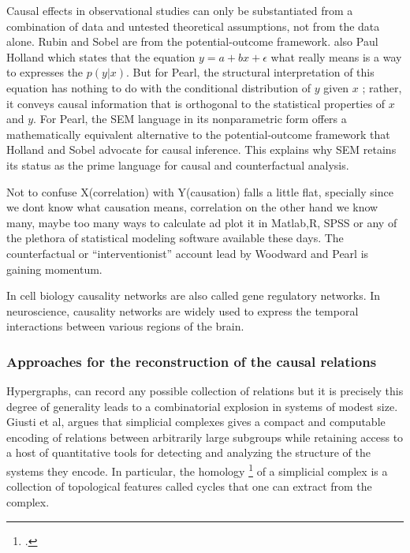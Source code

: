 \documentclass[onecollarge,runningheads]{svjour2}
\begin{document}
Causal effects in observational studies can only be substantiated from a combination of data and untested theoretical assumptions, not from the data alone.
Rubin and Sobel are from the potential-outcome framework. also Paul Holland which states that the equation $y = a +bx+ \epsilon$ what really means is a way to expresses the $p(y|x)$. But for Pearl, the  structural interpretation of this equation has nothing to do with the conditional distribution of ${y}$ given  ${x}$ ; rather, it conveys causal information that is orthogonal to the statistical properties of  ${x}$  and  ${y}$. For Pearl, the SEM language in its nonparametric form offers a mathematically equivalent alternative to the potential-outcome framework that Holland and Sobel advocate for causal inference. This explains why SEM retains its status as the prime language for causal and counterfactual analysis.

\citep{wiedermann2016statistics}
Not to confuse X(correlation) with Y(causation) falls a little flat, specially since we dont know what causation means, correlation on the other hand we know many, maybe too many ways to calculate ad plot it in Matlab,R, SPSS or any of the plethora of statistical modeling software available these days. 
The counterfactual or “interventionist” account lead by Woodward and Pearl is gaining momentum.

In cell biology causality networks are also called gene regulatory networks. In neuroscience, causality networks are widely used to express the temporal interactions between various regions of the brain.
\subsubsection{Approaches for the reconstruction of the causal relations}
Hypergraphs, can record any possible collection of relations but it is precisely this degree of generality leads to a combinatorial explosion in systems of modest size. 
Giusti et al, argues that simplicial complexes gives a compact and computable encoding of relations between arbitrarily large subgroups while retaining access to a host of quantitative tools for detecting and analyzing the structure of the systems they encode. In particular, the homology \footcite{Names of topological objects have a seemingly pathological tendency to conflict with terms in biology, so long have the two subjects been separated. Mathematical homology has no a priori relationship to the usual biological notion of homology} of a simplicial complex is a collection of topological features called cycles that one can extract from the complex.
\end{document}

